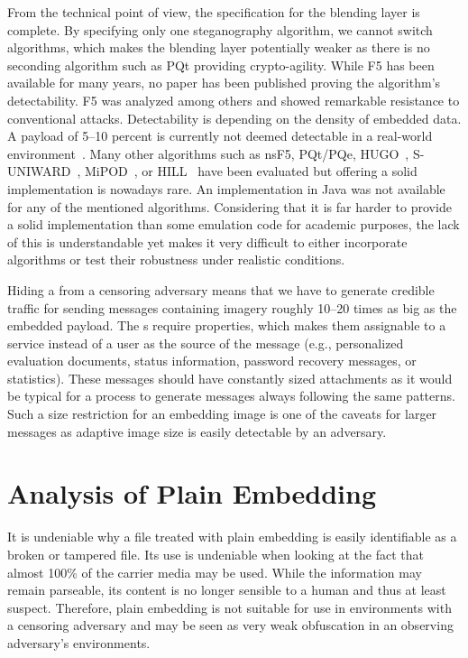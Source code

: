 From the technical point of view, the specification for the blending layer is complete. By specifying only one steganography algorithm, we cannot switch algorithms, which makes the blending layer potentially weaker as there is no seconding algorithm such as PQt providing crypto-agility. While F5 has been available for many years, no paper has been published proving the algorithm's detectability. F5 was analyzed among others and showed remarkable resistance to conventional attacks. Detectability is depending on the density of embedded data. A payload of 5--10 percent is currently not deemed detectable in a real-world environment~\cite{fridrich2007statistically}. Many other algorithms such as nsF5, PQt/PQe, HUGO~\cite{pevny2010using}, S-UNIWARD~\cite{holub2014universal}, MiPOD~\cite{sedighi2015content}, or HILL~\cite{li2014new} have been evaluated but offering a solid implementation is nowadays rare. An implementation in Java was not available for any of the mentioned algorithms. Considering that it is far harder to provide a solid implementation than some emulation code for academic purposes, the lack of this is understandable yet makes it very difficult to either incorporate algorithms or test their robustness under realistic conditions.

Hiding a \VortexNode{} from a censoring adversary means that we have to generate credible traffic for sending messages containing imagery roughly 10--20 times as big as the embedded payload. The s require properties, which makes them assignable to a service instead of a user as the source of the message (e.g., personalized evaluation documents, status information, password recovery messages, or statistics). These messages should have constantly sized attachments as it would be typical for a process to generate messages always following the same patterns. Such a size restriction for an embedding image is one of the caveats for larger messages as adaptive image size is easily detectable by an adversary. 

\section{Analysis of Plain Embedding}
It is undeniable why a file treated with plain embedding is easily identifiable as a broken or tampered file. Its use is undeniable when looking at the fact that almost 100\% of the carrier media may be used. While the information may remain parseable, its content is no longer sensible to a human and thus at least suspect. Therefore, plain embedding is not suitable for use in environments with a censoring adversary and may be seen as very weak obfuscation in an observing adversary's environments.

